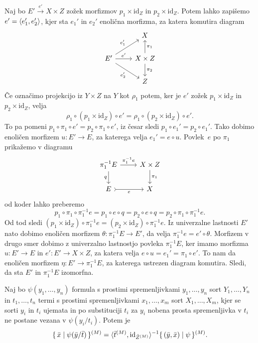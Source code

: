 \documentclass[../kategoricna_logika.tex]{subfiles}
\begin{document}
  \begin{dokaz}
    Naj bo $E' \xrightarrow{e'} X \times Z$ zožek morfizmov
    $p_1 \times \mathrm{id}_Z$ in $p_2 \times \mathrm{id}_Z$. Potem
    lahko zapišemo $e' = \langle e'_1, e'_2 \rangle$, kjer sta $e_1'$ in
    $e_2'$ enolična morfizma, za katera komutira diagram
    \begin{equation*}
      \begin{tikzcd}[row sep = normal]
        & X \\
        E' \ar[ur, "e_1'"] \ar[r, "e'"] \ar[dr, "e_2'"'] & X \times Z
        \ar[u, "\pi_1"'] \ar[d, "\pi_2"] \\
        & Z
      \end{tikzcd}
    \end{equation*}
    Če označimo projekcijo iz $Y \times Z$ na $Y$ kot
    $\rho_1$ potem, ker je $e'$ zožek $p_1 \times \mathrm{id}_Z$ in
    $p_2 \times \mathrm{id}_Z$, velja
    \[ \rho_1 \circ( p_1 \times \mathrm{id}_Z) \circ e' = \rho_1 \circ
     ( p_2 \times \mathrm{id}_Z) \circ e'.\] To pa pomeni
    $p_1 \circ \pi_1 \circ e' = p_2 \circ \pi_1 \circ e'$, iz česar
    sledi $p_1 \circ e_1' = p_2 \circ e_1'$. Tako dobimo enoličen
    morfizem $u : E' \to E$, za katerega velja $e_1' = e \circ
    u$. Povlek~$e$ po $\pi_1$ prikažemo v diagramu
    \begin{equation*}
      \begin{tikzcd}
        \pi_1^{-1}E \ar[d, "q"'] \ar[r, "\pi_1^{-1}e"] & X \times Z \ar[d, "\pi_1"] \\
        E \ar[r, tail, "e"'] & X
      \end{tikzcd}
    \end{equation*}
    od koder lahko preberemo
    \[ p_1 \circ \pi_1 \circ \pi_1^{-1}e = p_1 \circ e \circ q = p_2
      \circ e \circ q = p_2 \circ \pi_1 \circ \pi_1^{-1}e.\]
    Od tod sledi $(p_1 \times \mathrm{id}_Z) \circ \pi_1^{-1}e = (p_2 \times \mathrm{id}_Z) \circ \pi_1^{-1}e$.
    Iz univerzalne lastnosti $E'$ nato dobimo
    enoličen morfizem $\theta : \pi_1^{-1}E \to E'$, da velja
    $\pi_1^{-1}e = e' \circ \theta$.  Morfizem v drugo smer dobimo z
    univerzalno lastnostjo povleka $\pi_1^{-1}E$, ker imamo morfizma
    $u : E' \to E$ in $e' : E' \to X \times Z$, za katera velja
    $e \circ u = e_1' = \pi_1 \circ e'$. To nam da enoličen morfizem
    $\eta : E' \to \pi_1^{-1}E$, za katerega ustrezen diagram
    komutira.  Sledi, da sta $E'$ in $\pi_1^{-1}E$ izomorfna.
  \end{dokaz}
  \begin{lema}\label{lema:substitucija}
    Naj bo $\psi(y_1, \ldots, y_n)$ formula s prostimi spremenljivkami 
    $y_1, \ldots, y_n$ sort $Y_1, \ldots, Y_n$ in $t_1, \ldots, t_n$ termi s prostimi spremenljivkami
    $x_1, \ldots, x_m$ sort $X_1, \ldots, X_m$, kjer se sorti $y_i$ in $t_i$ ujemata in po substituciji
    $t_i$ za $y_i$ nobena prosta spremenljivka v $t_i$ ne postane vezana v $\psi(y_i/t_i)$.
    Potem je
    $$\lbrace\,\bar{x}  \mid  \psi(\bar{y}/\bar{t})\,\rbrace^{(M)} =
  \langle \bar{t}^{(M)}, \mathrm{id}_{{\bar{Z}}^{(M)}}\rangle^{-1} \lbrace\,(\bar{y},
    \bar{x})  \mid  \psi\,\rbrace^{(M)}.$$
\end{lema}
\end{document}
